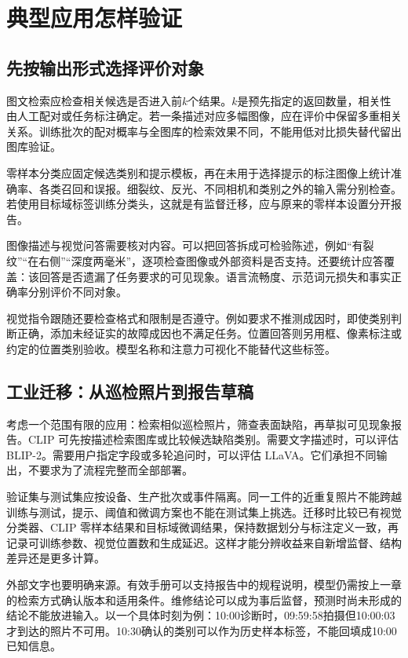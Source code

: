 \section{典型应用怎样验证}
\subsection{先按输出形式选择评价对象}
图文检索应检查相关候选是否进入前$k$个结果。$k$是预先指定的返回数量，相关性由人工配对或任务标注确定。若一条描述对应多幅图像，应在评价中保留多重相关关系。训练批次的配对概率与全图库的检索效果不同，不能用低对比损失替代留出图库验证。

零样本分类应固定候选类别和提示模板，再在未用于选择提示的标注图像上统计准确率、各类召回和误报。细裂纹、反光、不同相机和类别之外的输入需分别检查。若使用目标域标签训练分类头，这就是有监督迁移，应与原来的零样本设置分开报告。

图像描述与视觉问答需要核对内容。可以把回答拆成可检验陈述，例如“有裂纹”“在右侧”“深度两毫米”，逐项检查图像或外部资料是否支持。还要统计应答覆盖：该回答是否遗漏了任务要求的可见现象。语言流畅度、示范词元损失和事实正确率分别评价不同对象。

视觉指令跟随还要检查格式和限制是否遵守。例如要求不推测成因时，即使类别判断正确，添加未经证实的故障成因也不满足任务。位置回答则另用框、像素标注或约定的位置类别验收。模型名称和注意力可视化不能替代这些标签。

\subsection{工业迁移：从巡检照片到报告草稿}
考虑一个范围有限的应用：检索相似巡检照片，筛查表面缺陷，再草拟可见现象报告。CLIP 可先按描述检索图库或比较候选缺陷类别。需要文字描述时，可以评估 BLIP-2。需要用户指定字段或多轮追问时，可以评估 LLaVA。它们承担不同输出，不要求为了流程完整而全部部署。

验证集与测试集应按设备、生产批次或事件隔离。同一工件的近重复照片不能跨越训练与测试，提示、阈值和微调方案也不能在测试集上挑选。迁移时比较已有视觉分类器、CLIP 零样本结果和目标域微调结果，保持数据划分与标注定义一致，再记录可训练参数、视觉位置数和生成延迟。这样才能分辨收益来自新增监督、结构差异还是更多计算。

外部文字也要明确来源。有效手册可以支持报告中的规程说明，模型仍需按上一章的检索方式确认版本和适用条件。维修结论可以成为事后监督，预测时尚未形成的结论不能放进输入。以一个具体时刻为例：10:00诊断时，09:59:58拍摄但10:00:03才到达的照片不可用。10:30确认的类别可以作为历史样本标签，不能回填成10:00已知信息。

